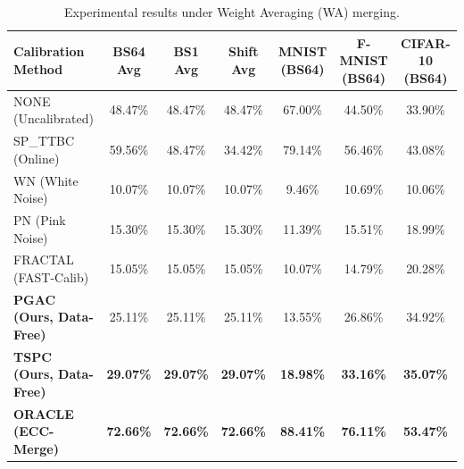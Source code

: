 \documentclass{article}
\theoremstyle{plain}
\theoremstyle{definition}
\theoremstyle{remark}
\begin{document}
\begin{table}[t]
\caption{Experimental results under Weight Averaging (WA) merging.}
\label{tab:results_wa}
\vskip 0.15in
\begin{center}
\begin{small}
\begin{sc}
\setlength{\tabcolsep}{4.5pt}
\begin{tabular}{lcccccc}
\toprule
Calibration Method & BS64 Avg & BS1 Avg & Shift Avg & MNIST (BS64) & F-MNIST (BS64) & CIFAR-10 (BS64) \\
\midrule
NONE (Uncalibrated) & 48.47\% & 48.47\% & 48.47\% & 67.00\% & 44.50\% & 33.90\% \\
SP\_TTBC (Online) & 59.56\% & 48.47\% & 34.42\% & 79.14\% & 56.46\% & 43.08\% \\
WN (White Noise) & 10.07\% & 10.07\% & 10.07\% & 9.46\% & 10.69\% & 10.06\% \\
PN (Pink Noise) & 15.30\% & 15.30\% & 15.30\% & 11.39\% & 15.51\% & 18.99\% \\
FRACTAL (FAST-Calib) & 15.05\% & 15.05\% & 15.05\% & 10.07\% & 14.79\% & 20.28\% \\
\textbf{PGAC (Ours, Data-Free)} & 25.11\% & 25.11\% & 25.11\% & 13.55\% & 26.86\% & 34.92\% \\
\textbf{TSPC (Ours, Data-Free)} & \textbf{29.07\%} & \textbf{29.07\%} & \textbf{29.07\%} & \textbf{18.98\%} & \textbf{33.16\%} & \textbf{35.07\%} \\
\textbf{ORACLE (ECC-Merge)} & \textbf{72.66\%} & \textbf{72.66\%} & \textbf{72.66\%} & \textbf{88.41\%} & \textbf{76.11\%} & \textbf{53.47\%} \\
\bottomrule
\end{tabular}
\end{sc}
\end{small}
\end{center}
\vskip -0.1in
\end{table}
\end{document}
